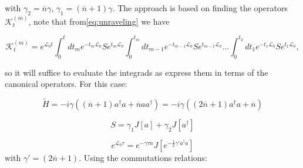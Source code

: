 with $\gamma_{2} = \overline{n}\gamma$, $\gamma_{1} = (\overline{n}+1)\gamma$. The approach is based on finding the operators $\mathcal{K}_{t}^{(m)}$,  note that from\eqref{eq:unraveling} we have

\begin{equation}\label{eq:kn_operators}
  \mathcal{K}_{t}^{(m)}=e^{\mathcal{L}_{0}t}\int_{0}^{t}dt_{m}e^{-t_{m}\mathcal{L}_{0}}Se^{t_{m}\mathcal{L}_{0}}\int_{0}^{t_{m}}dt_{m-1}e^{-t_{m-1}\mathcal{L}_{0}}Se^{t_{m-1}\mathcal{L}_{0}}...\int_{0}^{t_{2}}dt_{1}e^{-t_{1}\mathcal{L}_{0}}Se^{t_{1}\mathcal{L}_{0}},
\end{equation}

so it will suffice to evaluate the integrads as express them in terms of the canonical operators. For this case:

\begin{equation}
  \tilde{H} = -i\gamma\left((\overline{n}+1)a^{\dagger}a + \overline{n}aa^{\dagger} \right) = -i\gamma\left((2\overline{n}+1)a^{\dagger}a +\overline{n}  \right)
\end{equation}

\begin{equation}
  S = \gamma_{1}J[a]+\gamma_{2}J[a^{\dagger}]
\end{equation}

\begin{equation}
  e^{\mathcal{L}_{0}\tau} = e^{-\gamma\tau\overline{n}}J[e^{-\frac{1}{2}\gamma'a^{\dagger}a}]
\end{equation}
with $\gamma' = (2\overline{n}+1)$. Using the commutations relations:

